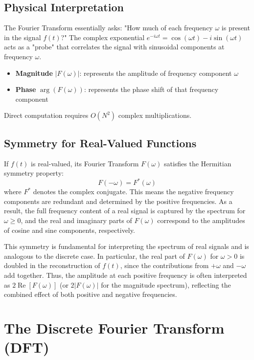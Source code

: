 \documentclass[11pt,a4paper]{article}
\begin{document}
\subsection{Physical Interpretation}

The Fourier Transform essentially asks: "How much of each frequency $\omega$ is present in the signal $f(t)$?" The complex exponential $e^{-i\omega t} = \cos(\omega t) - i\sin(\omega t)$ acts as a "probe" that correlates the signal with sinusoidal components at frequency $\omega$.

\begin{itemize}
    \item \textbf{Magnitude} $|F(\omega)|$: represents the amplitude of frequency component $\omega$
    \item \textbf{Phase} $\arg(F(\omega))$: represents the phase shift of that frequency component
\end{itemize}
Direct computation requires $O(N^2)$ complex multiplications.
\subsection{Symmetry for Real-Valued Functions}

If $f(t)$ is real-valued, its Fourier Transform $F(\omega)$ satisfies the Hermitian symmetry property:
\begin{equation}
F(-\omega) = F^*(\omega)
\end{equation}
where $F^*$ denotes the complex conjugate. This means the negative frequency components are redundant and determined by the positive frequencies. As a result, the full frequency content of a real signal is captured by the spectrum for $\omega \geq 0$, and the real and imaginary parts of $F(\omega)$ correspond to the amplitudes of cosine and sine components, respectively.

This symmetry is fundamental for interpreting the spectrum of real signals and is analogous to the discrete case. In particular, the real part of $F(\omega)$ for $\omega > 0$ is doubled in the reconstruction of $f(t)$, since the contributions from $+\omega$ and $-\omega$ add together. Thus, the amplitude at each positive frequency is often interpreted as $2\operatorname{Re}[F(\omega)]$ (or $2|F(\omega)|$ for the magnitude spectrum), reflecting the combined effect of both positive and negative frequencies.

\section{The Discrete Fourier Transform (DFT)}
\end{document}
